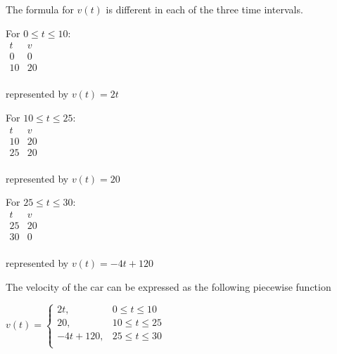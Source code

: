 \begin{solution}
	The formula for $v(t)$ is different in each of
	the three time intervals.  \\
	
\begin{minipage}{0.3\textwidth}
	For $0 \leq t \leq 10$: \\
	
	\vspace{-4mm}
\hspace{1cm} 	$\begin{array}{c|c} 
		t & v \\ \hline
		0 & 0 \\
		10 & 20 \\
\end{array}$

represented by $v(t)=2t$ 
\end{minipage}
\begin{minipage}{0.3\textwidth}
For $10 \leq t \leq 25$: \\

\vspace{-4mm}
\hspace{1cm} $\begin{array}{c|c} 
t & v \\ \hline
10 & 20 \\
25 & 20 \\
\end{array}$

represented by $v(t)=20$ 
\end{minipage}
\begin{minipage}{0.35\textwidth}
	For $25 \leq t \leq 30$: \\
	
	\vspace{-4mm} 
\hspace{1cm}	$\begin{array}{c|c} 
	t & v \\ \hline
	25 & 20 \\
	30 & 0 \\
	\end{array}$
	
represented by $v(t)=-4t+120$
	\end{minipage}	
	
	
\vspace{2mm} 	
 The velocity of the car  can be expressed as the following piecewise function 

\vspace{-0.5cm}
\begin{minipage}{0.5\textwidth}	
\hspace{1cm} $\displaystyle{ v(t) = \left\{ \begin{array}{cl}
	2t, & 0 \leq t \leq 10 \\
	20, & 10 \leq t \leq 25 \\
	-4t+120, & 25 \leq t \leq 30 \\
	\end{array} \right.}$	\\
	

\end{minipage}
\end{solution}
